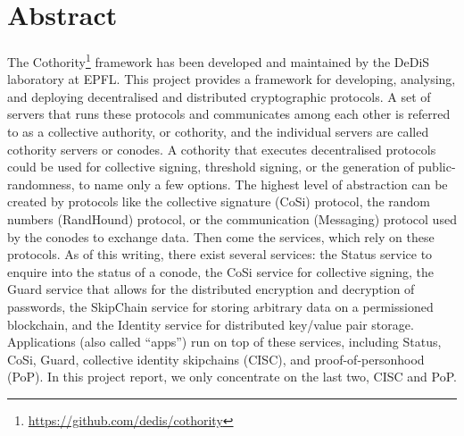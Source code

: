 \section*{Abstract\raisebox{.3\baselineskip}{\normalsize\footnotemark}}

\paragraph{}
The Cothority\footnote{\url{https://github.com/dedis/cothority}} framework has been developed and maintained by the DeDiS laboratory at EPFL. This project provides a framework for developing, analysing, and deploying decentralised and distributed cryptographic protocols. A set of servers that runs these protocols and communicates among each other is referred to as a collective authority, or cothority, and the individual servers are called cothority servers or conodes. A cothority that executes decentralised protocols could be used for collective signing, threshold signing, or the generation of public-randomness, to name only a few options. The highest level of abstraction can be created by protocols like the collective signature (CoSi) protocol, the random numbers (RandHound) protocol, or the communication (Messaging) protocol used by the conodes to exchange data. Then come the services, which rely on these protocols. As of this writing, there exist several services: the Status service to enquire into the status of a conode, the CoSi service for collective signing, the Guard service that allows for the distributed encryption and decryption of passwords, the SkipChain service for storing arbitrary data on a permissioned blockchain, and the Identity service for distributed key/value pair storage. Applications (also called “apps”) run on top of these services, including Status, CoSi, Guard, collective identity skipchains (CISC), and proof-of-personhood (PoP). In this project report, we only concentrate on the last two, CISC and PoP.

